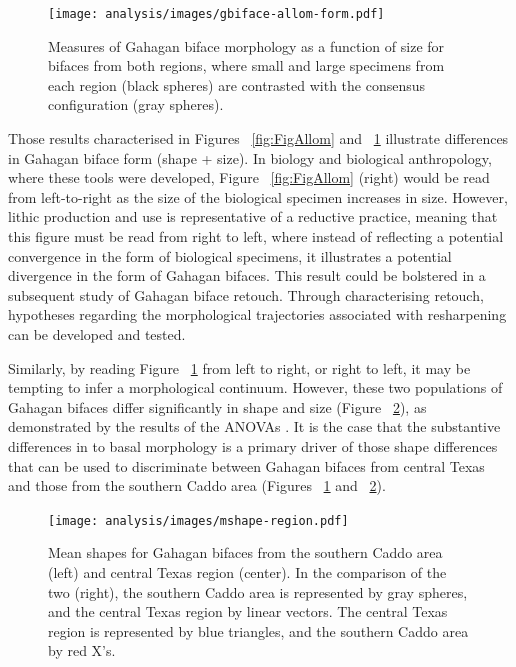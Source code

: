 \documentclass[review]{elsarticle}
\begin{document}
\begin{figure}[h!]\centering
\texttt{[image: analysis/images/gbiface-allom-form.pdf]}
\caption{Measures of Gahagan biface morphology as a function of size for bifaces from both regions, where small and large specimens from each region (black spheres) are contrasted with the consensus configuration (gray spheres).}
\label{fig:FigAllomForm}
\end{figure}

Those results characterised in Figures ~\ref{fig:FigAllom} and ~\ref{fig:FigAllomForm} illustrate differences in Gahagan biface form (shape + size). In biology and biological anthropology, where these tools were developed, Figure ~\ref{fig:FigAllom} (right) would be read from left-to-right as the size of the biological specimen increases in size. However, lithic production and use is representative of a reductive practice, meaning that this figure must be read from right to left, where instead of reflecting a potential convergence in the form of biological specimens, it illustrates a potential divergence in the form of Gahagan bifaces. This result could be bolstered in a subsequent study of Gahagan biface retouch. Through characterising retouch, hypotheses regarding the morphological trajectories associated with resharpening can be developed and tested.

Similarly, by reading Figure ~\ref{fig:FigAllomForm} from left to right, or right to left, it may be tempting to infer a morphological continuum. However, these two populations of Gahagan bifaces differ significantly in shape and size (Figure ~\ref{fig:FigMeanShp}), as demonstrated by the results of the ANOVAs \citep{RN20850}. It is the case that the substantive differences in to basal morphology is a primary driver of those shape differences that can be used to discriminate between Gahagan bifaces from central Texas and those from the southern Caddo area (Figures ~\ref{fig:FigAllomForm} and ~\ref{fig:FigMeanShp}).

\begin{figure}[h!]\centering
\texttt{[image: analysis/images/mshape-region.pdf]}
\caption{Mean shapes for Gahagan bifaces from the southern Caddo area (left) and central Texas region (center). In the comparison of the two (right), the southern Caddo area is represented by gray spheres, and the central Texas region by linear vectors. The central Texas region is represented by blue triangles, and the southern Caddo area by red X's.}
\label{fig:FigMeanShp}
\end{figure}
\end{document}
